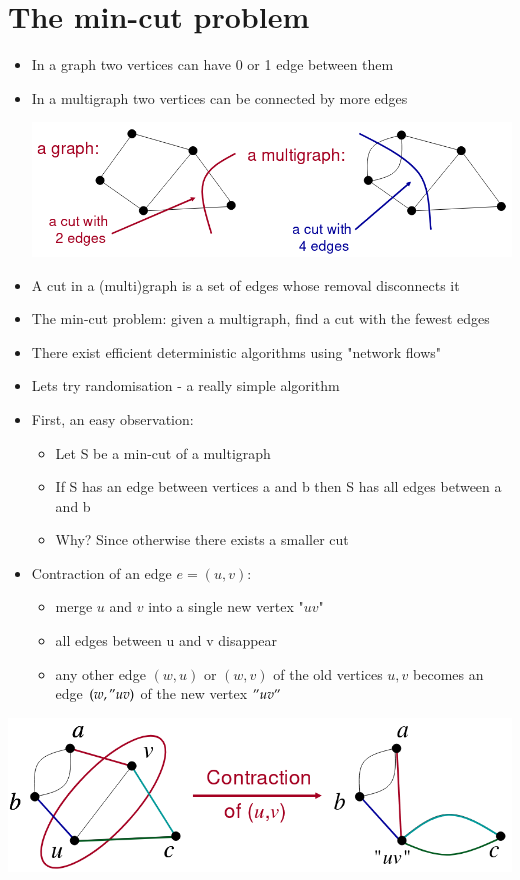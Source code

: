\documentclass{article}[18pt]
\begin{document}
\section{The min-cut problem}
\begin{itemize}
	\item In a graph two vertices can have 0 or 1 edge between them
	\item In a multigraph two vertices can be connected by more edges
	\begin{center}
		\includegraphics[scale=0.7]{Aggregate1}
	\end{center}
	\item A cut in a (multi)graph is a set of edges whose removal disconnects it
	\item The min-cut problem: given a multigraph, find a cut with the fewest edges
	\item There exist efficient deterministic algorithms using "network flows"
	\item Lets try randomisation - a really simple algorithm
	\item First, an easy observation:
	\begin{itemize}
		\item Let S be a min-cut of a multigraph
		\item If S has an edge between vertices a and b then S has all edges between a and b
		\item Why? Since otherwise there exists a smaller cut
	\end{itemize}
	\item Contraction of an edge $e=(u,v)$:
	\begin{itemize}
		\item merge $u$ and $v$ into a single new vertex "$uv$"
		\item all edges between u and v disappear
		\item any other edge $(w,u)$ or $(w,v)$ of the old vertices $u,v$ becomes an edge $(w,"uv)$ of the new vertex $"uv"$
	\end{itemize}
\end{itemize}
\begin{center}
	\includegraphics[scale=0.7]{contraction}
\end{center}
\end{document}
